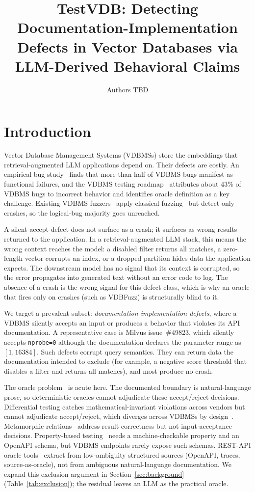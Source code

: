 \documentclass[sigconf]{acmart}
\title[TestVDB: doc-implementation defects in VDBMSs]{TestVDB: Detecting Documentation-Implementation Defects in Vector Databases via LLM-Derived Behavioral Claims}
\author{Authors TBD}
\affiliation{\institution{TBD (anonymity depends on venue)}\country{TBD}}
\begin{document}
\maketitle

\section{Introduction}
\label{sec:intro}

Vector Database Management Systems (VDBMSs) store the embeddings that retrieval-augmented LLM applications depend on. Their defects are costly. An empirical bug study~\cite{bugstudy25} finds that more than half of VDBMS bugs manifest as functional failures, and the VDBMS testing roadmap~\cite{roadmap25} attributes about 43\% of VDBMS bugs to incorrect behavior and identifies oracle definition as a key challenge. Existing VDBMS fuzzers~\cite{vdbfuzz26} apply classical fuzzing~\cite{manes21} but detect only crashes, so the logical-bug majority goes unreached.

A silent-accept defect does not surface as a crash; it surfaces as wrong results returned to the application. In a retrieval-augmented LLM stack, this means the wrong context reaches the model: a disabled filter returns all matches, a zero-length vector corrupts an index, or a dropped partition hides data the application expects. The downstream model has no signal that its context is corrupted, so the error propagates into generated text without an error code to log. The absence of a crash is the wrong signal for this defect class, which is why an oracle that fires only on crashes (such as VDBFuzz) is structurally blind to it.

We target a prevalent subset: \emph{documentation-implementation defects}, where a VDBMS silently accepts an input or produces a behavior that violates its API documentation. A representative case is Milvus issue~\#49823, which silently accepts \texttt{nprobe=0} although the documentation declares the parameter range as $[1, 16384]$. Such defects corrupt query semantics. They can return data the documentation intended to exclude (for example, a negative score threshold that disables a filter and returns all matches), and most produce no crash.

The oracle problem~\cite{barr15} is acute here. The documented boundary is natural-language prose, so deterministic oracles cannot adjudicate these accept/reject decisions. Differential testing catches mathematical-invariant violations across vendors but cannot adjudicate accept/reject, which diverges across VDBMSs by design~\cite{roadmap25}. Metamorphic relations~\cite{metmap24} address result correctness but not input-acceptance decisions. Property-based testing~\cite{claessen00} needs a machine-checkable property and an OpenAPI schema, but VDBMS endpoints rarely expose such schemas. REST-API oracle tools~\cite{agoraplus25,satori25,mastor26} extract from low-ambiguity structured sources (OpenAPI, traces, source-as-oracle), not from ambiguous natural-language documentation. We expand this exclusion argument in Section~\ref{sec:background} (Table~\ref{tab:exclusion}); the residual leaves an LLM as the practical oracle.
\end{document}
